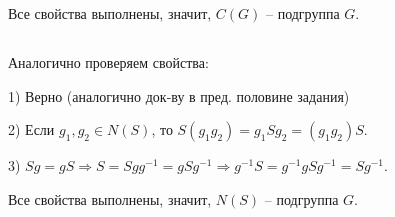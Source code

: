 \documentclass[12pt, a4paper]{article}
\theoremstyle{definition}
\begin{document}
Все свойства выполнены, значит, $C(G)$ -- подгруппа $G$.

\subsection{}

Аналогично проверяем свойства:

1) Верно (аналогично док-ву в пред. половине задания)

2) Если $g_1, g_2 \in N(S)$, то $S(g_1g_2) = g_1Sg_2 = (g_1g_2)S$.

3) $Sg = gS \Rightarrow S = Sgg^{-1} = gSg^{-1} \Rightarrow g^{-1}S = g^{-1}gSg^{-1} = Sg^{-1}$.

Все свойства выполнены, значит, $N(S)$ -- подгруппа $G$.
\end{document}
